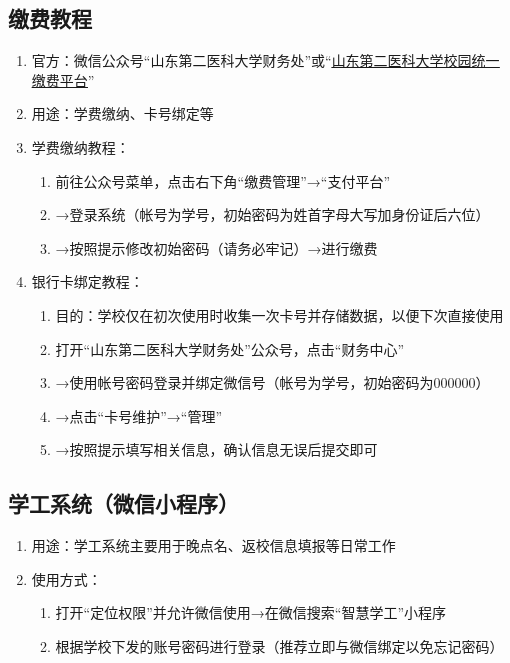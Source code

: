 \subsection[缴费教程]{缴费教程}
\label{fee_pay}
\begin{enumerate}
    \item 官方：微信公众号“山东第二医科大学财务处”或“\uline{\href{http://tyzfpt.sdsmu.edu.cn/xysf/login.aspx}{山东第二医科大学校园统一缴费平台}}”
    \item 用途：学费缴纳、卡号绑定等
    \item 学费缴纳教程：
          \begin{enumerate}
              \item 前往公众号菜单，点击右下角“缴费管理”→“支付平台”
              \item →登录系统（帐号为学号，初始密码为姓首字母大写加身份证后六位）
              \item →按照提示修改初始密码（请务必牢记）→进行缴费
          \end{enumerate}
    \item 银行卡绑定教程：
          \begin{enumerate}
              \item 目的：学校仅在初次使用时收集一次卡号并存储数据，以便下次直接使用\footnotemark
              \item 打开“山东第二医科大学财务处”公众号，点击“财务中心”
              \item →使用帐号密码登录并绑定微信号（帐号为学号，初始密码为000000）
              \item →点击“卡号维护”→“管理”
              \item →按照提示填写相关信息，确认信息无误后提交即可
          \end{enumerate}
\end{enumerate}

\subsection[学工系统（微信小程序）]{学工系统（微信小程序）}
\begin{enumerate}
    \item 用途：学工系统主要用于晚点名、返校信息填报等日常工作\footnotemark
    \item 使用方式：
          \begin{enumerate}
              \item 打开“定位权限”并允许微信使用→在微信搜索“智慧学工”小程序
              \item 根据学校下发的账号密码进行登录（推荐立即与微信绑定以免忘记密码）
          \end{enumerate}
\end{enumerate}

